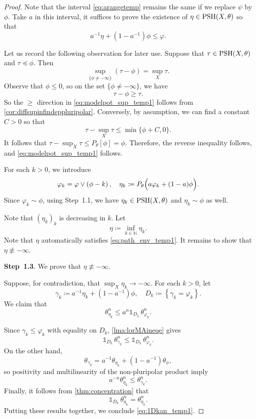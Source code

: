 \begin{proof}
    Note that the interval \eqref{eq:arangetemp} remains the same if we replace $\psi$ by $\phi$. Take $a$ in this interval, it suffices to prove the existence of $\eta\in \mathrm{PSH}(X,\theta)$ so that
    \begin{equation}\label{eq:path_env_temp1}
    a^{-1}\eta+\left(1-a^{-1}\right)\phi\leq \varphi.
    \end{equation}

    Let us record the following observation for later use. Suppose that $\tau\in \mathrm{PSH}(X,\theta)$ and $\tau\preceq \phi$. Then
    \begin{equation}\label{eq:modelpot_sup_temp1}
        \sup_{\{\phi\neq -\infty\}} (\tau-\phi)=\sup_X \tau.
    \end{equation}
    Observe that $\phi\leq 0$, so on the set $\{\phi\neq -\infty\}$, we have
    \[
    \tau-\phi\geq \tau.
    \]
    So the $\geq$ direction in \eqref{eq:modelpot_sup_temp1} follows from \cref{cor:diffsupinfindeppluripolar}.
    Conversely, by assumption, we can find a constant $C>0$ so that
    \[
    \tau-\sup_X \tau\leq \min\{\phi+C,0 \}.
    \]
    It follows that $\tau-\sup_X \tau\leq P_{\theta}[\phi]=\phi$. Therefore, the reverse inequality follows, and \eqref{eq:modelpot_sup_temp1} follows.

    For each $k>0$, we introduce
    \[
    \varphi_k=\varphi\lor \left(\phi-k\right),\quad \eta_k\coloneqq P_{\theta}\Bigl( a \varphi_k+(1-a)\phi \Bigr).
    \]
    Since $\varphi_k\sim \phi$, using Step~1.1, we have $\eta_k\in \mathrm{PSH}(X,\theta)$ and $\eta_k\sim \phi$ as well.

    Note that $(\eta_k)_k$ is decreasing in $k$. Let
    \[
    \eta\coloneqq \inf_{k\in \mathbb{N}} \eta_k.
    \]
    Note that $\eta$ automatically satisfies \eqref{eq:path_env_temp1}.
    It remains to show that $\eta\not\equiv -\infty$.

    \textbf{Step~1.3}. We prove that $\eta\not\equiv -\infty$.

    Suppose, for contradiction, that $\sup_X \eta_k\to -\infty$. For each $k>0$, let
    \[
    \gamma_k\coloneqq a^{-1}\eta_k+\left(1-a^{-1}\right)\phi,\quad D_k\coloneqq \left\{\gamma_k=\varphi_k\right\}.
    \]
    We claim that
    \begin{equation}\label{eq:1Dkan_temp1}
        \theta_{\eta_k}^n\leq a^n\mathds{1}_{D_k}\, \theta_{\varphi_k}^n.
    \end{equation}

    Since $\gamma_k\leq \varphi_k$ with equality on $D_k$, \cref{lma:lorMAineqe} gives
    \[
    \mathds{1}_{D_k}\, \theta_{\gamma_k}^n\leq \mathds{1}_{D_k}\, \theta_{\varphi_k}^n.
    \]
    On the other hand,
    \[
    \theta_{\gamma_k}=a^{-1}\theta_{\eta_k}+\left(1-a^{-1}\right)\theta_{\phi},
    \]
    so positivity and multilinearity of the non-pluripolar product imply
    \[
        a^{-n}\theta_{\eta_k}^n\leq \theta_{\gamma_k}^n.
    \]
    Finally, it follows from \cref{thm:concentration} that
    \[
    \mathds{1}_{D_k}\,\theta_{\eta_k}^n=\theta_{\eta_k}^n.
    \]
    Putting these results together, we conclude \eqref{eq:1Dkan_temp1}.





\end{proof}
